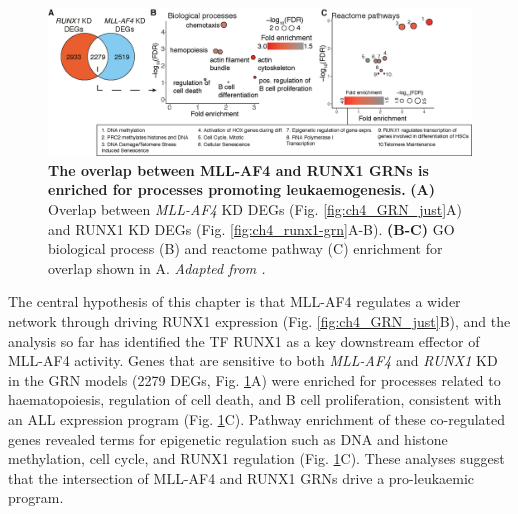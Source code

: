 \begin{figure}[!t]
    \centering
    \includegraphics[width=\textwidth,height=\textheight,keepaspectratio]{figures/chapter4/chr4_interplay.png}
    \caption[{The overlap between MLL-AF4 and RUNX1 GRNs is enriched for processes promoting leukaemogenesis.}]
    {\textbf{The overlap between MLL-AF4 and RUNX1 GRNs is enriched for processes promoting leukaemogenesis.} 
    \textbf{(A)} Overlap between \textit{MLL-AF4} KD DEGs (Fig. \ref{fig:ch4_GRN_just}A) and RUNX1 KD DEGs (Fig. \ref{fig:ch4_runx1-grn}A-B). 
    \textbf{(B-C)} GO biological process (B) and reactome pathway (C) enrichment for overlap shown in A. 
    \textit{Adapted from \cite{harman_kmt2a-aff1_2021}.}
    }
    \label{fig:ch4_interplay}
\end{figure}

The central hypothesis of this chapter is that MLL-AF4 regulates a wider network through driving RUNX1 expression (Fig. \ref{fig:ch4_GRN_just}B), and the analysis so far has identified the TF RUNX1 as a key downstream effector of MLL-AF4 activity. Genes that are sensitive to both \textit{MLL-AF4} and \textit{RUNX1} KD in the GRN models (2279 DEGs, Fig. \ref{fig:ch4_interplay}A) were enriched for processes related to haematopoiesis, regulation of cell death, and B cell proliferation, consistent with an ALL expression program (Fig. \ref{fig:ch4_interplay}C). Pathway enrichment of these co-regulated genes revealed terms for epigenetic regulation such as DNA and histone methylation, cell cycle, and RUNX1 regulation (Fig. \ref{fig:ch4_interplay}C). These analyses suggest that the intersection of MLL-AF4 and RUNX1 GRNs drive a pro-leukaemic program.

